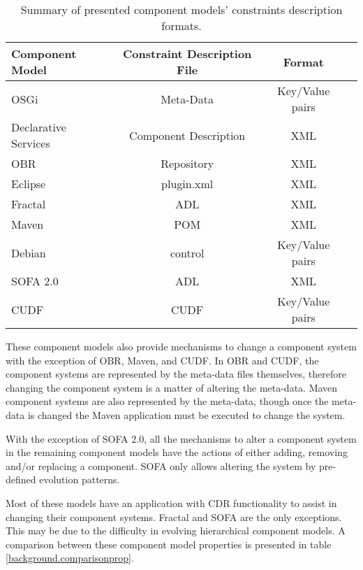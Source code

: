 \begin{table}
\begin{tabular}{|l || c | c | c | }
\hline \textbf{Component Model}& \textbf{Constraint Description File} & \textbf{Format}	\\\hline

OSGi					& Meta-Data				& Key/Value pairs 					\\
Declarative Services	& Component Description	& XML 								\\
OBR						& Repository			& XML								\\
Eclipse					& plugin.xml			& XML								\\
Fractal					& ADL					& XML 								\\
Maven					& POM					& XML 									\\
Debian					& control				& Key/Value pairs							\\
SOFA 2.0				& ADL					& XML 							\\
CUDF					& CUDF					& Key/Value pairs									\\\hline
\end{tabular}
\caption{Summary of presented component models' constraints description formats.}
\label{background.comparisonmeta}
\end{table}

These component models also provide mechanisms to change a component system with the exception of OBR, Maven, and CUDF.
In OBR and CUDF, the component systems are represented by the meta-data files themselves, therefore changing the component system is a matter of altering the meta-data. 
Maven component systems are also represented by the meta-data, though once the meta-data is changed the Maven application must be executed to change the system.

With the exception of SOFA 2.0, all the mechanisms to alter a component system in the remaining component models have the actions of either adding, removing and/or replacing a component.
SOFA only allows altering the system by pre-defined evolution patterns.

Most of these models have an application with CDR functionality to assist in changing their component systems.
Fractal and SOFA are the only exceptions.
This may be due to the difficulty in evolving hierarchical component models.
A comparison between these component model properties is presented in table \ref{background.comparisonprop}.

